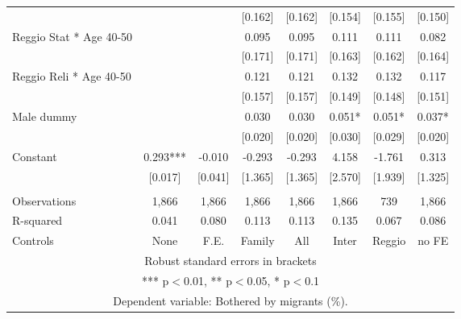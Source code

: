 \begin{tabular}{lccccccc}
 &  &  & [0.162] & [0.162] & [0.154] & [0.155] & [0.150] \\
Reggio Stat * Age 40-50 &  &  & 0.095 & 0.095 & 0.111 & 0.111 & 0.082 \\
 &  &  & [0.171] & [0.171] & [0.163] & [0.162] & [0.164] \\
Reggio Reli * Age 40-50 &  &  & 0.121 & 0.121 & 0.132 & 0.132 & 0.117 \\
 &  &  & [0.157] & [0.157] & [0.149] & [0.148] & [0.151] \\
Male dummy &  &  & 0.030 & 0.030 & 0.051* & 0.051* & 0.037* \\
 &  &  & [0.020] & [0.020] & [0.030] & [0.029] & [0.020] \\
Constant & 0.293*** & -0.010 & -0.293 & -0.293 & 4.158 & -1.761 & 0.313 \\
 & [0.017] & [0.041] & [1.365] & [1.365] & [2.570] & [1.939] & [1.325] \\
 &  &  &  &  &  &  &  \\
Observations & 1,866 & 1,866 & 1,866 & 1,866 & 1,866 & 739 & 1,866 \\
R-squared & 0.041 & 0.080 & 0.113 & 0.113 & 0.135 & 0.067 & 0.086 \\
 Controls & None & F.E. & Family & All & Inter & Reggio & no FE \\ \hline
\multicolumn{8}{c}{ Robust standard errors in brackets} \\
\multicolumn{8}{c}{ *** p$<$0.01, ** p$<$0.05, * p$<$0.1} \\
\multicolumn{8}{c}{ Dependent variable: Bothered by migrants (\%).} \\
\end{tabular}
